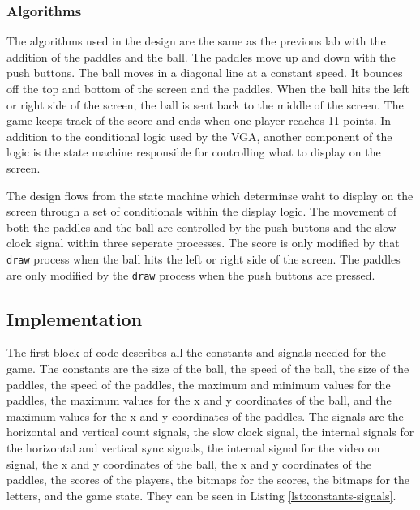 \documentclass{article}
\newcommand{\code}[1]{\lstinline|#1|}
\begin{document}
\subsubsection*{Algorithms}
The algorithms used in the design are the same as the previous lab with the addition of the paddles and the ball. The paddles move up and down with the push buttons. The ball moves in a diagonal line at a constant speed. It bounces off the top and bottom of the screen and the paddles. When the ball hits the left or right side of the screen, the ball is sent back to the middle of the screen. The game keeps track of the score and ends when one player reaches 11 points. In addition to the conditional logic used by the VGA, another component of the logic is the state machine responsible for controlling what to display on the screen.

The design flows from the state machine which determinse waht to display on the screen through a set of conditionals within the display logic. The movement of both the paddles and the ball are controlled by the push buttons and the slow clock signal within three seperate processes. The score is only modified by that \code{draw} process when the ball hits the left or right side of the screen. The paddles are only modified by the \code{draw} process when the push buttons are pressed.

\subsection*{Implementation}
The first block of code describes all the constants and signals needed for the game. The constants are the size of the ball, the speed of the ball, the size of the paddles, the speed of the paddles, the maximum and minimum values for the paddles, the maximum values for the x and y coordinates of the ball, and the maximum values for the x and y coordinates of the paddles. The signals are the horizontal and vertical count signals, the slow clock signal, the internal signals for the horizontal and vertical sync signals, the internal signal for the video on signal, the x and y coordinates of the ball, the x and y coordinates of the paddles, the scores of the players, the bitmaps for the scores, the bitmaps for the letters, and the game state.
They can be seen in Listing \ref{lst:constants-signals}. 
\end{document}
